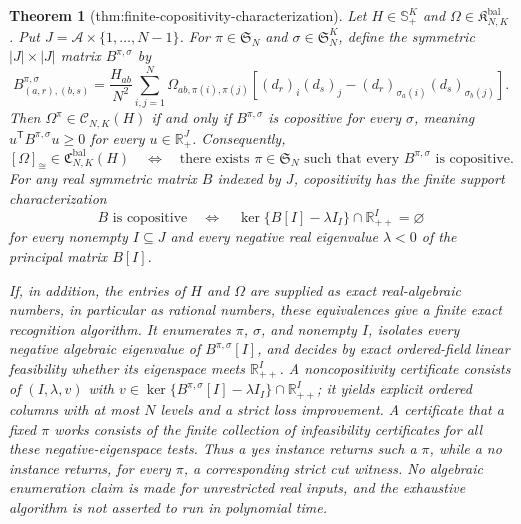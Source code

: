\documentclass{article}
\newtheorem{theorem}{Theorem}
\begin{document}
\begin{theorem}[thm:finite-copositivity-characterization]\label{thm:finite-copositivity-characterization}
Let \(H\in\mathbb S_+^K\) and \(\Omega\in\mathfrak K^{\mathrm{bal}}_{N,K}\).  Put \(J=\mathcal A\times\{1,\ldots,N-1\}\).  For \(\pi\in\mathfrak S_N\) and \(\sigma\in\mathfrak S_N^K\), define the symmetric \(|J|\times|J|\) matrix \(B^{\pi,\sigma}\) by
\[
 B^{\pi,\sigma}_{(a,r),(b,s)}
 =\frac{H_{ab}}{N^2}\sum_{i,j=1}^N\Omega_{ab,\pi(i),\pi(j)}
 \left[(d_r)_i(d_s)_j-(d_r)_{\sigma_a(i)}(d_s)_{\sigma_b(j)}\right].
\]
Then \(\Omega^\pi\in\mathcal C_{N,K}(H)\) if and only if \(B^{\pi,\sigma}\) is copositive for every \(\sigma\), meaning \(u^{\mathsf T}B^{\pi,\sigma}u\geq0\) for every \(u\in\mathbb R_+^J\).  Consequently,
\[
 [\Omega]_{\cong}\in\mathfrak C^{\mathrm{bal}}_{N,K}(H)
 \quad\Longleftrightarrow\quad
 \text{there exists }\pi\in\mathfrak S_N\text{ such that every }B^{\pi,\sigma}\text{ is copositive}.
\]
For any real symmetric matrix \(B\) indexed by \(J\), copositivity has the finite support characterization
\[
 B\text{ is copositive}
 \quad\Longleftrightarrow\quad
 \ker\{B[I]-\lambda I_I\}\cap\mathbb R_{++}^{I}=\varnothing
\]
for every nonempty \(I\subseteq J\) and every negative real eigenvalue \(\lambda<0\) of the principal matrix \(B[I]\).

If, in addition, the entries of \(H\) and \(\Omega\) are supplied as exact real-algebraic numbers, in particular as rational numbers, these equivalences give a finite exact recognition algorithm.  It enumerates \(\pi\), \(\sigma\), and nonempty \(I\), isolates every negative algebraic eigenvalue of \(B^{\pi,\sigma}[I]\), and decides by exact ordered-field linear feasibility whether its eigenspace meets \(\mathbb R_{++}^{I}\).  A noncopositivity certificate consists of \((I,\lambda,v)\) with \(v\in\ker\{B^{\pi,\sigma}[I]-\lambda I_I\}\cap\mathbb R_{++}^{I}\); it yields explicit ordered columns with at most \(N\) levels and a strict loss improvement.  A certificate that a fixed \(\pi\) works consists of the finite collection of infeasibility certificates for all these negative-eigenspace tests.  Thus a yes instance returns such a \(\pi\), while a no instance returns, for every \(\pi\), a corresponding strict cut witness.  No algebraic enumeration claim is made for unrestricted real inputs, and the exhaustive algorithm is not asserted to run in polynomial time.
\end{theorem}
\end{document}
